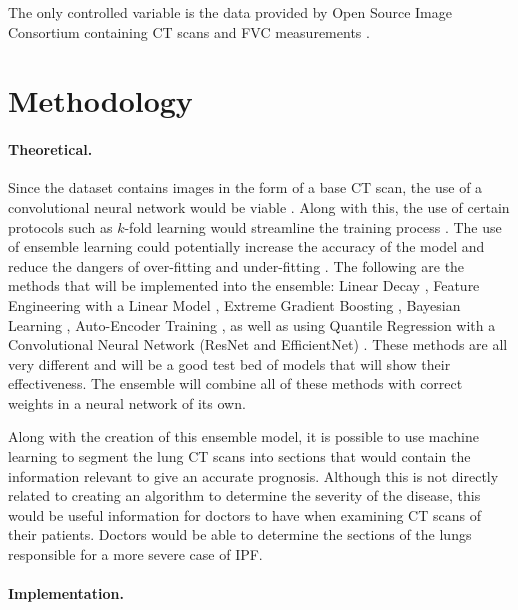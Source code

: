 \documentclass[12pt]{article}
\begin{document}
The only controlled variable is the data provided by Open Source Image Consortium containing CT scans and FVC measurements \cite{kaggle}.

\section*{Methodology}

\paragraph*{Theoretical.}

Since the dataset contains images in the form of a base CT scan, the use of a convolutional neural network would be viable \cite{xu2014deep}. 
Along with this, the use of certain protocols such as $k$-fold learning would streamline the training process \cite{friedman2001elements}. 
The use of ensemble learning could potentially increase the accuracy of the model and reduce the dangers of over-fitting and under-fitting \cite{dietterich2002ensemble}.
The following are the methods that will be implemented into the ensemble: Linear Decay \cite{10.1145/2939672.2939785}, Feature Engineering with a Linear Model \cite{10.5555/3239815}, Extreme Gradient Boosting \cite{10.1145/2939672.2939785}, Bayesian Learning \cite{10.5555/525544}, Auto-Encoder Training \cite{10.5555/3045796.3045801}, as well as using Quantile Regression \cite{jia2020deep} with a Convolutional Neural Network (ResNet and EfficientNet) \cite{10.5555/553011}.
These methods are all very different and will be a good test bed of models that will show their effectiveness.
The ensemble \cite{10.5555/648054.743935} will combine all of these methods with correct weights in a neural network of its own.

Along with the creation of this ensemble model, it is possible to use machine learning to segment the lung CT scans into sections that would contain the information relevant to give an accurate prognosis. 
Although this is not directly related to creating an algorithm to determine the severity of the disease, this would be useful information for doctors to have when examining CT scans of their patients.
Doctors would be able to determine the sections of the lungs responsible for a more severe case of IPF.

\paragraph*{Implementation.}
\end{document}
